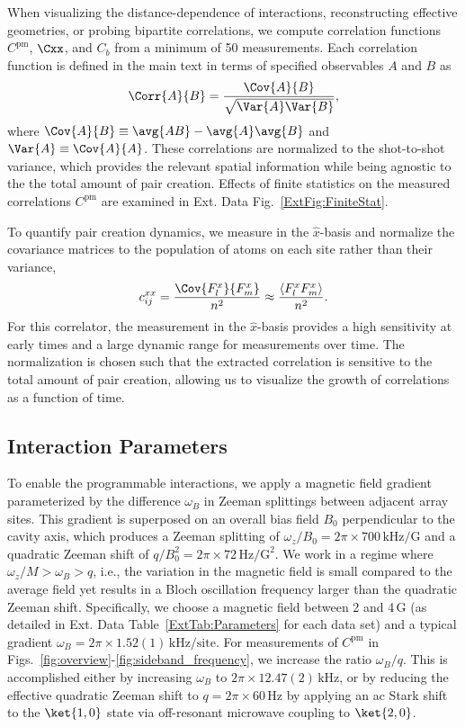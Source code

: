 \documentclass[aps,pra,twocolumn,superscriptaddress]{revtex4-1} %
\begin{document}
\begin{bibunit}
When visualizing the distance-dependence of interactions, reconstructing effective geometries, or probing bipartite correlations, we compute correlation functions $C^\mathrm{pm}$,  $\Cxx$, and $C_b$ from a minimum of 50 measurements.  Each correlation function is defined in the main text in terms of specified observables $A$ and $B$ as
\begin{equation}
    \Corr{A}{B} = \frac{\Cov{A}{B}}{\sqrt{\Var{A}\Var{B}}},
\end{equation}
where $\Cov{A}{B} \equiv \avg{AB}-\avg{A}\avg{B}$ and $\Var{A} \equiv \Cov{A}{A}$.  These correlations are normalized to the shot-to-shot variance, which provides the relevant spatial information while being agnostic to the the total amount of pair creation. Effects of finite statistics on the measured correlations $C^\mathrm{pm}$ are examined in Ext. Data Fig.~\ref{ExtFig:FiniteStat}.

To quantify pair creation dynamics, we measure in the $\hat{x}$-basis and normalize the covariance matrices to the population of atoms on each site rather than their variance,
\begin{equation}
    c^{xx}_{ij} = \frac{\Cov{F_l^x}{F_m^x}}{n^2} \approx \frac{\langle F_l^x F_m^x \rangle}{n^2}.
\end{equation}
For this correlator, the measurement in the $\hat{x}$-basis provides a high sensitivity at early times and a large dynamic range for measurements over time.
The normalization is chosen such that  the extracted correlation is sensitive to the total amount of pair creation, allowing us to visualize the growth of correlations as a function of time.

\subsection{Interaction Parameters}
To enable the programmable interactions, we apply a magnetic field gradient parameterized by the difference $\omega_B$ in Zeeman splittings between adjacent array sites.  This gradient is superposed on an overall bias field $B_0$ perpendicular to the cavity axis, which produces a Zeeman splitting of $\omega_z/B_0 = 2\pi\times700\,\text{kHz}/\text{G}$ and a quadratic Zeeman shift of $q/B_0^2 = 2\pi\times 72\,\text{Hz}/\text{G}^2$. We work in a regime where $\omega_z/M > \omega_B > q$, i.e., the variation in the magnetic field is small compared to the average field yet results in a Bloch oscillation frequency larger than the quadratic Zeeman shift. Specifically, we choose a magnetic field between 2 and 4\,G (as detailed in Ext. Data Table~\ref{ExtTab:Parameters} for each data set) and a typical gradient $\omega_B = 2\pi\times 1.52(1)\,\text{kHz/site}$. For measurements of $C^{\text{pm}}$ in Figs.~\ref{fig:overview}-\ref{fig:sideband_frequency}, we increase the ratio $\omega_B/q$.  This is accomplished either by increasing $\omega_B$ to $2\pi\times 12.47(2)\,\text{kHz}$, or by reducing the effective quadratic Zeeman shift to $q = 2\pi\times 60\,\text{Hz}$ by applying an ac Stark shift to the $\ket{1,0}$ state via off-resonant microwave coupling to $\ket{2,0}$.


\end{bibunit}
\end{document}
